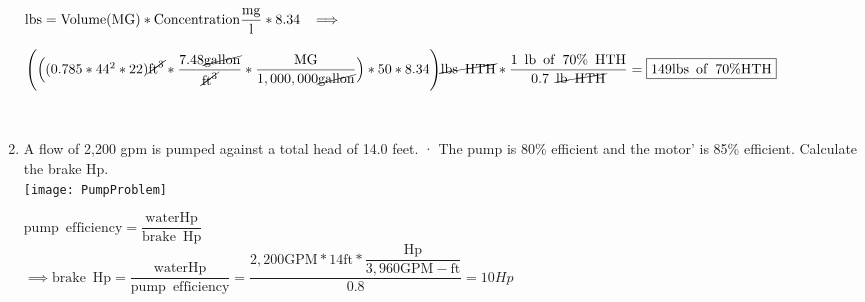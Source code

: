\documentclass{article}
\begin{document}
\begin{enumerate}
$\mathrm{lbs}=\mathrm{Volume}{\mathrm{(MG)}}* \mathrm{Concentration}\dfrac{\mathrm{mg}}{\mathrm{l}}*8.34 \hspace{0.2cm} \implies $\\

\vspace{0.2cm}

\scriptsize{

$\Bigg(\Big( (0.785*44^2*22)\cancel{\mathrm{ft}^3}*\dfrac{7.48\cancel{\mathrm{gallon}}}{\cancel{\mathrm{ft}^3}}*\dfrac{\mathrm{MG}}{1,000,000\cancel{\mathrm{gallon}}}\Big)*50*8.34 \Bigg)\cancel{\mathrm{lbs \enspace HTH}}*\dfrac{1 \enspace \mathrm{lb \enspace of \enspace 70\% \enspace HTH}}{0.7 \enspace \cancel{\mathrm{lb \enspace HTH}}}  =\boxed{149 \mathrm{lbs \enspace of \enspace 70\% HTH}}$}\\




\item A flow of 2,200 gpm  is pumped against a total head of 14.0 feet. · The pump is 80\% efficient and the motor' is 85\% efficient. Calculate the brake Hp.\\

 

 

\vspace{0.4cm}\texttt{[image: PumpProblem]}\\

\vspace{0.3cm}

$\mathrm{pump \enspace efficiency}=\dfrac{\mathrm{water Hp}}{\mathrm{brake \enspace Hp}}$\\

$\implies \mathrm{brake \enspace Hp}=\dfrac{\mathrm{water Hp}}{\mathrm{pump \enspace efficiency}}=\dfrac{2,200\mathrm{GPM}*14\mathrm{ft}*\dfrac{\mathrm{Hp}}{3,960 \mathrm{GPM-ft}}}{0.8}=\boxed{10Hp}$

\end{enumerate}
\end{document}
